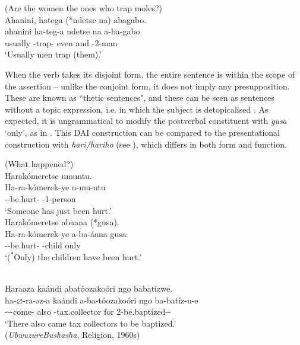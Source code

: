 \documentclass[output=paper]{langscibook}
\begin{document}

\z

\ea
\label{bkm:Ref105424268}
(Are the women the ones who trap moles?)\\
Ahanini, hatega (*ndetse na) abagabo.\\
\gll
ahanini  ha-teg-a  ndetse  na  a-ba-gabo\\
usually  \EXP{}-trap-\FV{}  even  and  \AUG{}-2-man\\
\glt
‘Usually men trap (them).’\\

\z

When the verb takes its disjoint form, the entire sentence is within the scope of the assertion – unlike the conjoint form, it does not imply any presupposition. These are known as ``thetic sentences", and these can be seen as sentences without a topic expression, i.e. in which the subject is detopicalised  \citep{LambrechtPolinsky1997,Lambrecht2000,Sasse1987}. As expected, it is ungrammatical to modify the postverbal constituent with \textit{gusa} ‘only’, as in . This DAI construction can be compared to the presentational construction with \textit{hari/hariho} (see ), which differs in both form and function.

\ea
(What happened?)\\
\ea
Harakómeretse umuntu.\\
\gll
Ha-ra-kómerek-ye  u-mu-ntu\\
\EXP{}-\DJ{}-be.hurt-\PFV{}  \AUG{}-1-person\\
\glt
‘Someone has just been hurt.’\\

\ex
\label{bkm:Ref79131990}
Harakómeretse abaana (*gusa).\\
\gll
Ha-ra-kómerek-ye  a-ba-áana  gusa\\
\EXP-\DJ-{}be.hurt-\PFV{}  -child  only\\
\glt
‘(\textsuperscript{$*$}Only) the children have been hurt.’\\

\z
\z

\ea
\citep[152]{Nshemezimana2016}\\
Haraaza kaándi abatóozakoóri ngo babatízwe.\\
\gll
ha-$\varnothing$-ra-ǝz-a  kaándi  a-ba-tóozakoóri   ngo  ba-batíz-u-e \\
\EXP-\PRS-\DJ-{}come-\FV{} also  -{}tax.collector   for  2\SM-{}be.baptized-\PASS-\SBJV{}   \\
\glt
  ‘There also came tax collectors to be baptized.’\\
(\textit{UbwuzureBushasha}, Religion, 1960s)
\end{document}

